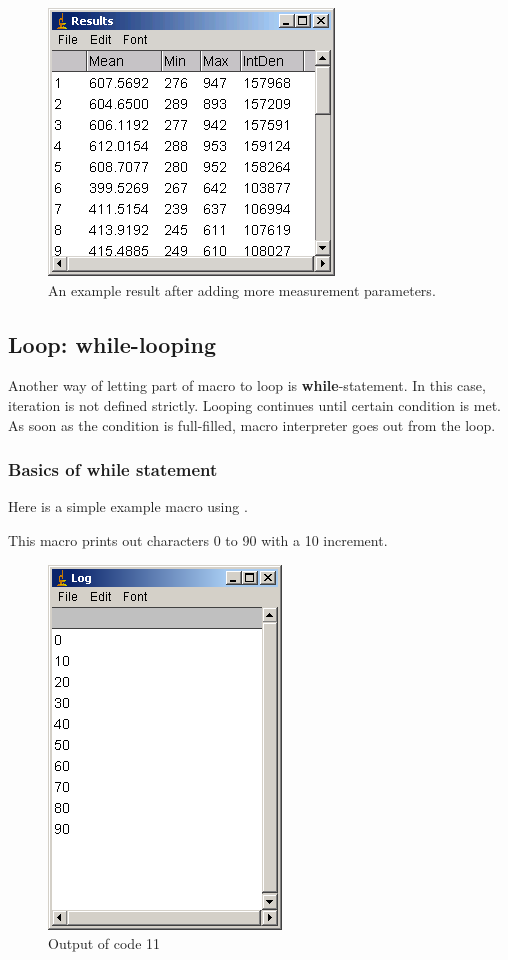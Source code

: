 \begin{figure}[htbp]
\begin{center}
\includegraphics[scale=0.5]{fig/fig2322_moreResultsTable.png}
\caption{An example result after adding more measurement parameters.}
\label{fig_MoreMeasurementPara}
\end{center}
\end{figure} 

\subsection{Loop: while-looping}

Another way of letting part of macro to loop is \textbf{while}-statement. In this case, iteration is not defined strictly. Looping continues until certain condition is met. As soon as the condition is full-filled, macro interpreter goes out from the loop.

\subsubsection{Basics of while statement}
Here is a simple example macro using .

This macro prints out characters 0 to 90 with a 10 increment. 

\begin{figure}[htbp]
\begin{center}
\includegraphics[scale=0.4]{fig/fig2331_Code11out.png}
\caption{Output of code 11}
\label{fig:code11 output}
\end{center}
\end{figure} 

